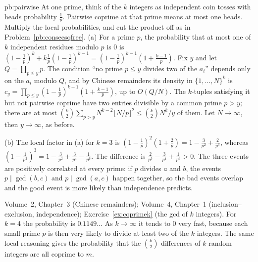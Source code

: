\begin{solution}{pb:pairwise}
\idea At one prime, think of the $k$ integers as independent coin tosses with heads probability $\frac1p$. Pairwise coprime at that prime means at most one heads. Multiply the local probabilities, and cut the product off as in Problem~\ref{pb:consecsqfree}.
\writeup (a) For a prime $p$, the probability that at most one of $k$ independent residues modulo $p$ is $0$ is
$(1-\frac1p)^k+k\frac1p(1-\frac1p)^{k-1}=(1-\frac1p)^{k-1}(1+\frac{k-1}p)$. Fix $y$ and let $Q=\prod_{p\le y}p$. The condition ``no
prime $p\le y$ divides two of the $a_i$'' depends only on the $a_i$ modulo $Q$, and by Chinese remainders its density in
$\{1,\dots,N\}^k$ is $c_y=\prod_{p\le y}(1-\frac1p)^{k-1}(1+\frac{k-1}p)$, up to $O(Q/N)$. The $k$-tuples satisfying it but not
pairwise coprime have two entries divisible by a common prime $p>y$; there are at most
$\binom k2\sum_{p>y}N^{k-2}\lfloor N/p\rfloor^2\le\binom k2N^k/y$ of them. Let $N\to\infty$, then $y\to\infty$, as before.

(b) The local factor in (a) for $k=3$ is $(1-\frac1p)^2(1+\frac2p)=1-\frac3{p^2}+\frac2{p^3}$, whereas $(1-\frac1{p^2})^3=1-\frac3{p^2}+\frac3{p^4}-\frac1{p^6}$.
The difference is $\frac2{p^3}-\frac3{p^4}+\frac1{p^6}>0$. The three events are positively correlated at every prime: if $p$
divides $a$ and $b$, the events $p\mid\gcd(b,c)$ and $p\mid\gcd(a,c)$ happen together, so the bad events overlap and the good
event is more likely than independence predicts.

\tools Volume~2, Chapter~3 (Chinese remainders); Volume~4, Chapter~1 (inclusion--exclusion, independence); Exercise~\ref{ex:coprimek} (the gcd of $k$ integers).
\leads For $k=4$ the probability is $0.1149\ldots$ As $k\to\infty$ it tends to $0$ very fast, because each small prime
$p$ is then very likely to divide at least two of the $k$ integers. The same local reasoning gives the probability that
the $\binom k2$ differences of $k$ random integers are all coprime to $m$.
\end{solution}

